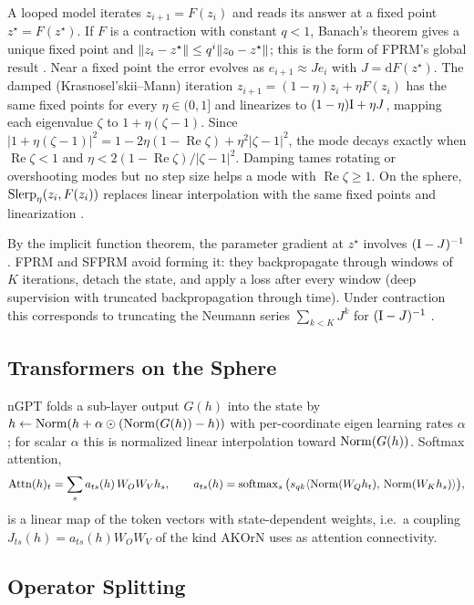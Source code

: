 A looped model iterates $z_{i+1}=F(z_i)$ and reads its answer at a fixed point $z^\star=F(z^\star)$. If
$F$ is a contraction with constant $q<1$, Banach's theorem gives a unique fixed point and
$\lVert z_i-z^\star\rVert\le q^i\lVert z_0-z^\star\rVert$; this is the form of FPRM's global result
\citep{movahedi2026fprm}. Near a fixed point the error evolves as $e_{i+1}\approx Je_i$ with
$J=\mathrm dF(z^\star)$. The damped (Krasnosel'skii--Mann) iteration
$z_{i+1}=(1-\eta)z_i+\eta F(z_i)$ \citep{mann1953} has the same fixed points for every $\eta\in(0,1]$ and
linearizes to $(1-\eta)\mathrm{I}+\eta J$, mapping each eigenvalue $\zeta$ to $1+\eta(\zeta-1)$. Since
$|1+\eta(\zeta-1)|^2=1-2\eta(1-\operatorname{Re}\zeta)+\eta^2|\zeta-1|^2$, the mode decays exactly when
$\operatorname{Re}\zeta<1$ and $\eta<2(1-\operatorname{Re}\zeta)/|\zeta-1|^2$. Damping tames rotating
or overshooting modes but no step size helps a mode with $\operatorname{Re}\zeta\ge1$. On the sphere,
$\operatorname{Slerp}_\eta(z_i,F(z_i))$ replaces linear interpolation with the same fixed points and linearization
\citep{sfprm}.

By the implicit function theorem, the parameter gradient at $z^\star$ involves $(\mathrm{I}-J)^{-1}$. FPRM
and SFPRM avoid forming it: they backpropagate through windows of $K$ iterations, detach the state, and
apply a loss after every window (deep supervision with truncated backpropagation through time). Under
contraction this corresponds to truncating the Neumann series $\sum_{k<K}J^k$ for $(\mathrm{I}-J)^{-1}$
\citep{movahedi2026fprm}.

\subsection{Transformers on the Sphere}

nGPT \citep{loshchilov2025ngpt} folds a sub-layer output $G(h)$ into the state by
$h\leftarrow\operatorname{Norm}(h+\alpha\odot(\operatorname{Norm}(G(h))-h))$ with per-coordinate eigen learning rates $\alpha$; for
scalar $\alpha$ this is normalized linear interpolation toward $\operatorname{Norm}(G(h))$. Softmax attention,
\begin{equation}
  \operatorname{Attn}(h)_t=\sum_sa_{ts}(h)\,W_OW_Vh_s,\qquad
  a_{ts}(h)=\operatorname{softmax}_s\big(s_{qk}\langle \operatorname{Norm}(W_Qh_t),\, \operatorname{Norm}(W_Kh_s)\rangle\big),
\end{equation}
is a linear map of the token vectors with state-dependent weights, i.e.\ a coupling
$J_{ts}(h)=a_{ts}(h)W_OW_V$ of the kind AKOrN uses as attention connectivity.

\subsection{Operator Splitting}

